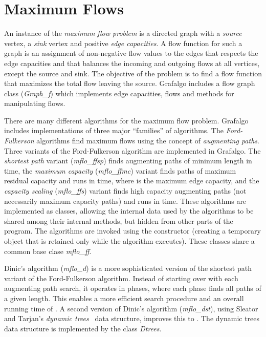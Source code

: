 \documentclass[11pt]{article}
\begin{document}
\section{Maximum Flows}

An instance of the {\sl maximum flow problem} is a directed graph with a {\sl source} vertex,
a {\sl sink} vertex and positive {\sl edge capacities}. A flow function for such a graph is
an assignment of non-negative flow values to the edges that respects the edge capacities
and that balances the incoming and outgoing flows at all vertices, except the source and sink.
The objective of the problem is to find a flow function that maximizes the total flow leaving
the source.
Grafalgo includes a flow graph class ({\sl Graph\_f}) which implements edge capacities, flows
and methods for manipulating flows.

There are many different algorithms for the maximum flow problem. Grafalgo includes
implementations of three major ``families'' of algorithms.
The {\sl Ford-Fulkerson} algorithms find maximum flows using the concept of {\sl augmenting paths}.
Three variants of the Ford-Fulkerson algorithm are implemented in Grafalgo.
The {\sl shortest path} variant ({\sl mflo\_ffsp}) finds augmenting paths of minimum length in  time,
the {\sl maximum capacity} ({\sl mflo\_ffmc}) variant finds paths of maximum residual capacity
and runs in  time, where  is the maximum edge capacity,
and the {\sl capacity scaling} ({\sl mflo\_ffs}) variant finds high capacity augmenting paths (not necessarily
maximum capacity paths) and runs in  time.
These algorithms are implemented as classes,
allowing the internal data used by the algorithms to be shared among their internal methods,
but hidden from other parts of the program. The algorithms are invoked using the constructor
(creating a temporary object that is retained only while the algorithm executes).
These classes share a common base clase {\sl mflo\_ff}.

Dinic's algorithm ({\sl mflo\_d}) is a more sophisticated version of the shortest path variant of the
Ford-Fulkerson algorithm. Instead of starting over with each augmenting path search,
it operates in phases, where each phase finds all paths of a given length. This enables
a more efficient search procedure and an overall running time of .
A second version of Dinic's algorithm ({\sl mflo\_dst}), using Sleator and Tarjan's 
{\sl dynamic trees}~\cite{ST81} data structure,  improves this to .
The dynamic trees data structure is implemented by the class {\sl Dtrees}.
\end{document}
